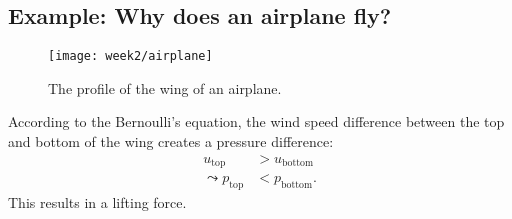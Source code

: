 \subsection{Example: Why does an airplane fly?}
\begin{figure}[!h]
    \centering
    \texttt{[image: week2/airplane]}
    \caption{The profile of the wing of an airplane.}
    \label{fig:airplane}
\end{figure}
According to the Bernoulli's equation, the wind speed difference between the top and bottom of the wing creates a pressure difference:
\begin{align}
u_\mathrm{top} &> u_\mathrm{bottom}\\
\leadsto
p_\mathrm{top} &< p_\mathrm{bottom}.
\end{align}
This results in a lifting force.